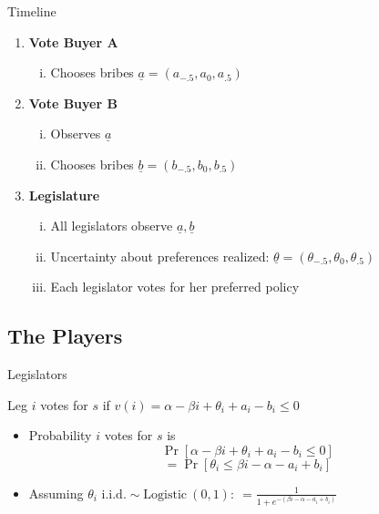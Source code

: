 \documentclass[handout]{beamer}
\newcommand{\ta}{\theta}
\newcommand{\un}{\underline}
\begin{document}
\begin{frame}{Timeline}
\pause
\begin{enumerate}[<+->]
	\item {\bfseries Vote Buyer A}
		\begin{enumerate}[i.]
			\item Chooses bribes $\un{a} = \left(a_{-.5},a_0,a_{.5}\right)$
		\end{enumerate}
	\item \textbf{Vote Buyer B}
		\begin{enumerate}[i.]
			\item Observes $\un{a}$
			\item Chooses bribes $\un{b} = \left(b_{-.5},b_0,b_{.5}\right)$
		\end{enumerate}
	\item \textbf{Legislature}
		\begin{enumerate}[i.]
			\item All legislators observe $\un{a},\un{b}$
			\item Uncertainty about preferences realized: $\un{\ta} = \left(\ta_{-.5},\ta_0,\ta_{.5}\right)$
			\item Each legislator votes for her preferred policy 
		\end{enumerate}
\end{enumerate}
\end{frame}


\subsection{The Players}

\begin{frame}{Legislators}

\pause
Leg $i$ votes for $s$ if $v(i) = \alpha -\beta i + \ta_i + a_i - b_i \leq 0$
	\begin{itemize}[<+->]
		\item Probability $i$ votes for $s$ is
			\[ 
				\Pr\left[\alpha -\beta i + \ta_i + a_i - b_i \leq 0 \right]
			\]
			\[
				= \Pr\left[\ta_i \leq \beta i - \alpha - a_i + b_i \right]
			\]
		\item Assuming $\ta_i \text{ i.i.d.} \sim \text{Logistic} \ (0,1): \ = \frac{1}{1+e^{-\left(\beta i - \alpha - a_i + b_i \right)}}$ 
	\end{itemize}



\end{frame}
\end{document}
